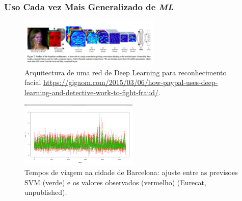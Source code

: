 \documentclass[hyperref={pdfpagelabels=true}]{beamer}
\begin{document}
\begin{frame}
\frametitle{Uso Cada vez Mais Generalizado de \textit{ML}}
    \begin{figure}   
         \includegraphics[width=0.6\textwidth]{deep.png}
         \caption{Arquitectura de uma red de Deep Learning para reconhecimento facial \url{https://gigaom.com/2015/03/06/how-paypal-uses-deep-learning-and-detective-work-to-fight-fraud/}.}%
    \end{figure} 
    
    \begin{figure}   
        \includegraphics[width=0.5\textwidth]{prediction.png}
        \caption{Tempos de viagem na cidade de Barcelona: ajuste entre as previsoes SVM (verde) e os valores observados (vermelho) (Eurecat, unpublished).}
    \end{figure} 
    
\end{frame}


          
\end{document}
